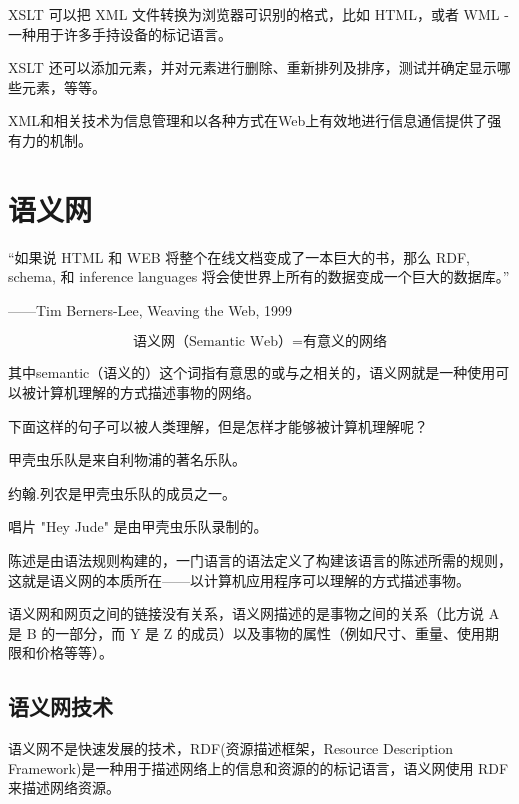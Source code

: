 XSLT 可以把 XML 文件转换为浏览器可识别的格式，比如 HTML，或者 WML - 一种用于许多手持设备的标记语言。

XSLT 还可以添加元素，并对元素进行删除、重新排列及排序，测试并确定显示哪些元素，等等。

	
XML和相关技术为信息管理和以各种方式在Web上有效地进行信息通信提供了强有力的机制。







\chapter{语义网}

“如果说 HTML 和 WEB 将整个在线文档变成了一本巨大的书，那么 RDF, schema, 和 inference languages 将会使世界上所有的数据变成一个巨大的数据库。” 

\begin{flushright}
——Tim Berners-Lee, Weaving the Web, 1999
\end{flushright}

$$\text{语义网（Semantic Web）}=\text{有意义的网络}$$

其中semantic（语义的）这个词指有意思的或与之相关的，语义网就是一种使用可以被计算机理解的方式描述事物的网络。

下面这样的句子可以被人类理解，但是怎样才能够被计算机理解呢？

\begin{compactitem}
\item 甲壳虫乐队是来自利物浦的著名乐队。
\item 约翰.列农是甲壳虫乐队的成员之一。
\item 唱片 "Hey Jude" 是由甲壳虫乐队录制的。
\end{compactitem}


陈述是由语法规则构建的，一门语言的语法定义了构建该语言的陈述所需的规则，这就是语义网的本质所在——以计算机应用程序可以理解的方式描述事物。



语义网和网页之间的链接没有关系，语义网描述的是事物之间的关系（比方说 A 是 B 的一部分，而 Y 是 Z 的成员）以及事物的属性（例如尺寸、重量、使用期限和价格等等）。

\section{语义网技术}

语义网不是快速发展的技术，RDF(资源描述框架，Resource Description Framework)是一种用于描述网络上的信息和资源的的标记语言，语义网使用 RDF 来描述网络资源。

